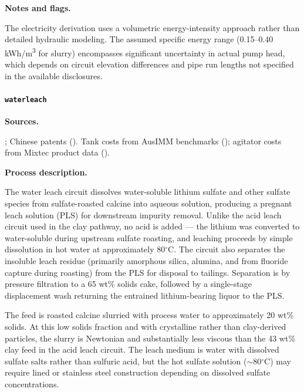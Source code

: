 \documentclass{article}
\renewcommand\_{\textunderscore\allowbreak}
\begin{document}
\medskip
\noindent\textbf{Notes and flags.}\quad

The electricity derivation uses a volumetric energy-intensity approach rather than detailed hydraulic modeling. The assumed specific energy range (0.15--0.40 \si{kWh/m^3} for slurry) encompasses significant uncertainty in actual pump head, which depends on circuit elevation differences and pipe run lengths not specified in the available disclosures.

\clearpage
\paragraph{\texttt{water\_leach}}\label{app:04-methods-blockdefs-waterleach}\leavevmode\par

\medskip
\noindent\textbf{Sources.}\quad

\citet{dengSystematicReviewSulfate2026, gaoLithiumExtractionHard2023, parkEffectiveLithiumExtraction2023, yanExtractionLithiumLepidolite2012}; Chinese patents (\citet{zouMethodEfficientLithium2024, nanMethodsExtractingLithium2019, nanMethodsExtractingLithium2022}). Tank costs from AusIMM benchmarks (\citet{ausimmMonograph27Cost}); agitator costs from Mixtec product data (\citet{baguleyMixtechAustraliaFluid2009}).


\medskip
\noindent\textbf{Process description.}\quad

The water leach circuit dissolves water-soluble lithium sulfate and other sulfate species from sulfate-roasted calcine into aqueous solution, producing a pregnant leach solution (PLS) for downstream impurity removal. Unlike the acid leach circuit used in the clay pathway, no acid is added --- the lithium was converted to water-soluble  during upstream sulfate roasting, and leaching proceeds by simple dissolution in hot water at approximately 80$^\circ$C. The circuit also separates the insoluble leach residue (primarily amorphous silica, alumina, and  from fluoride capture during roasting) from the PLS for disposal to tailings. Separation is by pressure filtration to a 65 wt\% solids cake, followed by a single-stage displacement wash returning the entrained lithium-bearing liquor to the PLS.

The feed is roasted calcine slurried with process water to approximately 20 wt\% solids. At this low solids fraction and with crystalline rather than clay-derived particles, the slurry is Newtonian and substantially less viscous than the 43 wt\% clay feed in the acid leach circuit. The leach medium is water with dissolved sulfate salts rather than sulfuric acid, but the hot sulfate solution ($\sim$80$^\circ$C) may require lined or stainless steel construction depending on dissolved sulfate concentrations.
\end{document}
